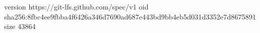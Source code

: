 version https://git-lfs.github.com/spec/v1
oid sha256:8fbc4ee9fbba4f6426a346d7690ad687e443bd9bb4eb5d031d3352e7d8675891
size 43864
